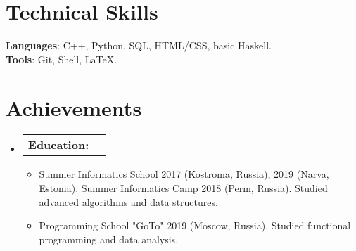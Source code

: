 \documentclass[letterpaper,11pt]{article}
\makeatletter
\newcommand{\resumeItem}[1]{
  \item\small{
    {#1 \vspace{-4pt}}
  }
}
\newcommand{\resumeProjectHeading}[2]{
    \item
    \begin{tabular*}{0.97\textwidth}{l@{\extracolsep{\fill}}r}
      \small#1 & #2 \\
    \end{tabular*}\vspace{-7pt}
}
\newcommand{\resumeSubHeadingListStart}{\begin{itemize}[leftmargin=0.15in, label={}]}
\newcommand{\resumeSubHeadingListEnd}{\end{itemize}}
\newcommand{\resumeItemListStart}{\begin{itemize}[leftmargin=0.15in]}
\newcommand{\resumeItemListEnd}{\end{itemize}\vspace{-5pt}}
\makeatother
\begin{document}
\section{Technical Skills}
\begin{itemize}[leftmargin=0.15in, label={}]
    \small{\item{
     \textbf{Languages}{: C++, Python, SQL, HTML/CSS, basic Haskell.} \\
     \textbf{Tools}{: Git, Shell, LaTeX.} \\
    }\vspace{-4pt}}
    
\end{itemize}




%
\section{Achievements}
    \resumeSubHeadingListStart
        \resumeProjectHeading
            {\textbf{Education: }}{}
            \resumeItemListStart
                \resumeItem{Summer Informatics School 2017 (Kostroma, Russia), 2019 (Narva, Estonia). Summer Informatics Camp 2018 (Perm, Russia). Studied advanced algorithms and data structures.}
                \resumeItem{Programming School "GoTo" 2019 (Moscow, Russia). Studied functional programming and data analysis.}
            \resumeItemListEnd
    \resumeSubHeadingListEnd


\end{document}
